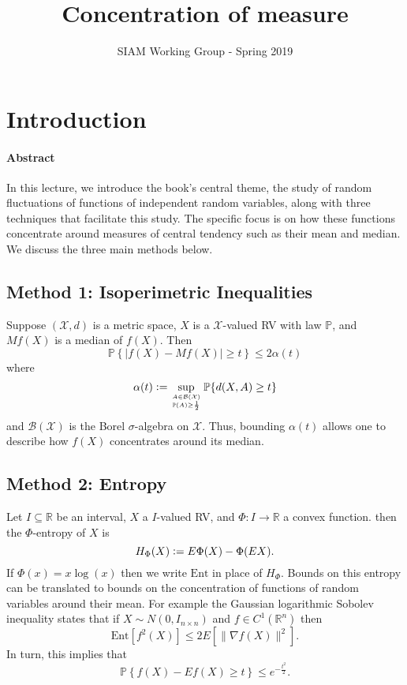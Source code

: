 \documentclass{amsproc}
\title{Concentration of measure}
\author{SIAM Working Group - Spring 2019}
\newcommand{\defeq}{\vcentcolon=} %
\newcommand{\R}{\mathbb{R}}
\newcommand{\Rn}{\mathbb{R}^n}
\renewcommand{\P}{\mathbb{P}} %
\begin{document}
\maketitle
\tableofcontents


\section{Introduction}
\label{sec:introduction}
\paragraph{\textbf{Abstract}}
	In this lecture, we introduce the book's central theme, the study of random fluctuations of functions of independent random variables, along with three techniques that facilitate this study. The specific focus is on how these functions concentrate around measures of central tendency such as their mean and median. We discuss the three main methods below.

\subsection*{Method 1: Isoperimetric Inequalities}
\label{sec:method_of_isoperimetric_inequalities}
	Suppose $(\mathcal{X},d)$ is a metric space, $X$ is a $\mathcal{X}$-valued RV with law $\P$, and $Mf(X)$ is a median of $f(X)$. Then
	\[
		\P\left\{|f(X)-Mf(X)|\geq t\right\}\leq 2\alpha(t)
	\]
	where
	\[
		\alpha(t)\defeq\sup_{A\in \mathcal{B}(\mathcal{X})\atop \P(A)\geq\frac{1}{2}}\P\{d(X,A)\geq t\}
	\]
	and $\mathcal{B}(\mathcal{X})$ is the Borel $\sigma$-algebra on $\mathcal{X}$. Thus, bounding $\alpha(t)$ allows one to describe how $f(X)$ concentrates around its median.

\subsection*{Method 2: Entropy}
\label{sec:entropy_method}
	Let $I\subseteq\R$ be an interval, $X$ a $I$-valued RV, and $\Phi:I\to\R$ a convex function. then the $\Phi$-entropy of $X$ is
	\[
		H_\Phi(X)\defeq E\Phi(X)-\Phi(EX).
	\]
	If $\Phi(x)=x\log(x)$ then we write $\text{Ent}$ in place of $H_\Phi$. Bounds on this entropy can be translated to bounds on the concentration of functions of random variables around their mean. For example the Gaussian logarithmic Sobolev inequality states that if $X\sim N(0,I_{n\times n})$ and $f\in C^1(\Rn)$ then
	\[
		\text{Ent}\left[f^2(X)\right]\leq 2E\left[\|\nabla f(X)\|^2\right].
	\]
	In turn, this implies that
	\[
		\P\left\{f(X)-Ef(X)\geq t\right\}\leq e^{-\frac{t^2}{2}}.
	\]
\end{document}

